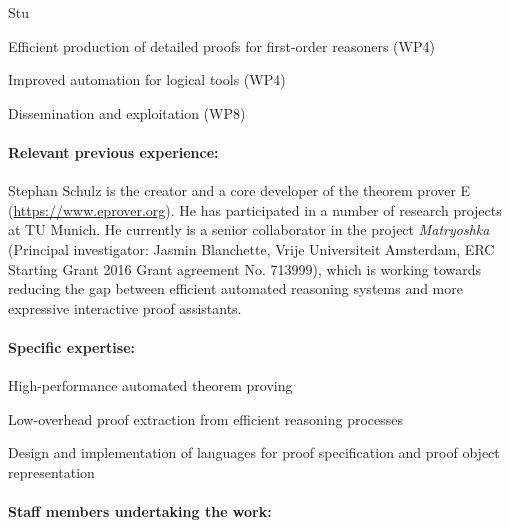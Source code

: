 \begin{sitedescription}{Stu}
\begin{compactitem}
\item Efficient production of detailed proofs for first-order
  reasoners (WP4)
\item Improved automation for logical tools (WP4)
\item Dissemination and exploitation (WP8)
\end{compactitem}


\paragraph{Relevant previous experience:}

Stephan Schulz is the creator and a core developer of the theorem
prover E (\url{https://www.eprover.org}).  He has participated in a
number of research projects at TU Munich. He currently is a senior
collaborator in the project \emph{Matryoshka} (Principal investigator:
Jasmin Blanchette, Vrije Universiteit Amsterdam, ERC Starting Grant
2016 Grant agreement No. 713999), which is working towards reducing
the gap between efficient automated reasoning systems and more
expressive interactive proof assistants.

\paragraph{Specific expertise:}

\begin{compactitem}
\item High-performance automated theorem proving
\item Low-overhead proof extraction from efficient reasoning processes
\item Design and implementation of languages for proof specification
  and proof object representation
\end{compactitem}

\paragraph{Staff members undertaking the work:}



\end{sitedescription}
